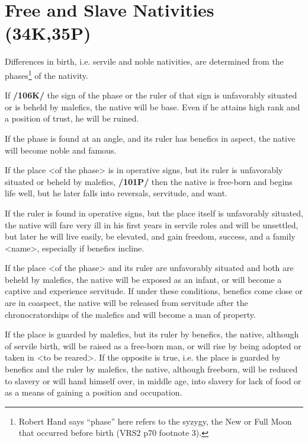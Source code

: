 \section{Free and Slave Nativities (34K,35P)}

Differences in birth, i.e. servile and noble nativities, are determined from the phases\footnote{Robert Hand says ``phase'' here refers to the syzygy, the New or Full Moon that occurred before birth (VRS2 p70 footnote 3).} of the nativity.

If \textbf{/106K/} the sign of the phase or the ruler of that sign is unfavorably situated or is beheld by malefics, the
native will be base. Even if he attains high rank and a position of trust, he will be ruined. 

If the phase is found at an angle, and its ruler has benefics in aspect, the native will become noble and famous. 

If the place <of the phase> is in operative signs, but its ruler is unfavorably situated or beheld by malefics, \textbf{/101P/} then the native is free-born and begins life well, but he later falls into reversals, servitude, and want. 

If \mndl the ruler is found in operative signs, but the place itself is unfavorably situated, the native will fare very ill in his first years in servile roles and will be unsettled, but later he will live easily, be elevated, and gain freedom, success, and a family <name>, especially if benefics incline. 

If the place <of the phase> and its ruler are unfavorably situated and both are beheld by malefics, the native will be exposed as an infant, or will become a captive and experience servitude. If under these conditions, benefics come close or are in coaspect, the native will be released from servitude after the chronocratorships of the malefics and will become
a man of property. 

If the place is guarded by malefics, but its ruler by benefics, the native, although of servile birth, will be raised as a free-born man, or will rise by being adopted or taken in <to be reared>. If the opposite is true, i.e. the place is guarded by benefics and the ruler by malefics, the native, although freeborn, will be reduced to slavery or will hand himself over, in middle age, into slavery for lack of food or as a means of gaining a position and occupation.

\newpage